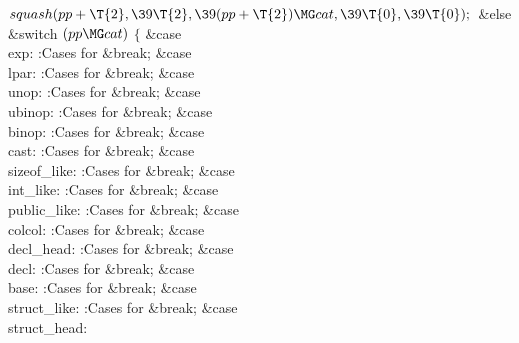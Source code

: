 ${}\\{squash}(\\{pp}+\T{2},\39\T{2},\39(\\{pp}+\T{2})\MG\\{cat},\39\T{0},\39%
\T{0});{}$\2\6
\&{else}\1\6
\&{switch} ${}(\\{pp}\MG\\{cat}){}$\5
${}\{{}$\1\6
\4\&{case} \\{exp}:\5
:Cases for \X\5
\&{break};\6
\4\&{case} \\{lpar}:\5
:Cases for \X\5
\&{break};\6
\4\&{case} \\{unop}:\5
:Cases for \X\5
\&{break};\6
\4\&{case} \\{ubinop}:\5
:Cases for \X\5
\&{break};\6
\4\&{case} \\{binop}:\5
:Cases for \X\5
\&{break};\6
\4\&{case} \\{cast}:\5
:Cases for \X\5
\&{break};\6
\4\&{case} \\{sizeof\_like}:\5
:Cases for \X\5
\&{break};\6
\4\&{case} \\{int\_like}:\5
:Cases for \X\5
\&{break};\6
\4\&{case} \\{public\_like}:\5
:Cases for \X\5
\&{break};\6
\4\&{case} \\{colcol}:\5
:Cases for \X\5
\&{break};\6
\4\&{case} \\{decl\_head}:\5
:Cases for \X\5
\&{break};\6
\4\&{case} \\{decl}:\5
:Cases for \X\5
\&{break};\6
\4\&{case} \\{base}:\5
:Cases for \X\5
\&{break};\6
\4\&{case} \\{struct\_like}:\5
:Cases for \X\5
\&{break};\6
\4\&{case} \\{struct\_head}:\5
